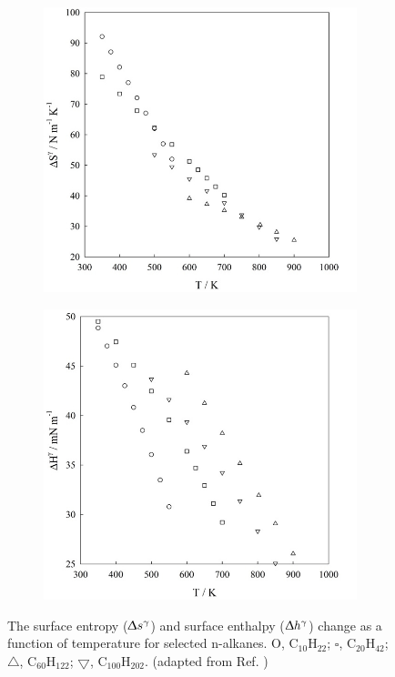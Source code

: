 \documentclass[9pt,tutorial]{livecoms}
\begin{document}
\begin{figure}[h]
	\centering
	\begin{subfigure}{0.68\linewidth} %
    \includegraphics[width=1\textwidth]{gfx/image68.jpeg}
	\end{subfigure}
	\begin{subfigure}{0.68\linewidth} %
    \includegraphics[width=1\textwidth]{gfx/image69.jpeg}
	\end{subfigure}
\caption{The surface entropy (${\Updelta}s^{\mathrm{{\gamma}}}$)
and surface enthalpy (${\Updelta}h^{\mathrm{{\gamma}}}$) change as
a function of temperature for selected n-alkanes. O, C$_{10}$H$_{22}$;
${\square}$, C$_{20}$H$_{42}$; ${\bigtriangleup}$, C$_{60}$H$_{122}$;
${\bigtriangledown}$, C$_{100}$H$_{202}$. (adapted from Ref. \citep{muller2011})}
\label{fig:22}
\end{figure}
\end{document}
